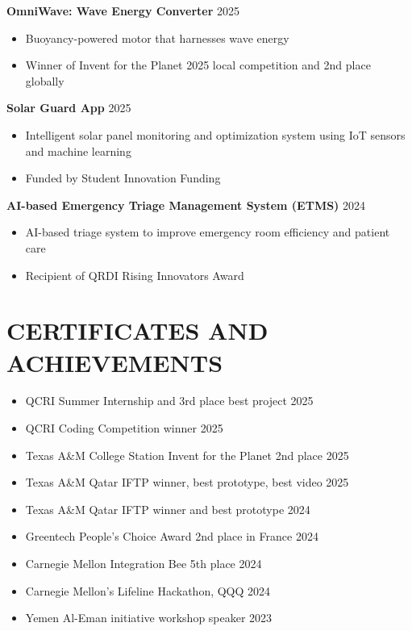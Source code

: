 \documentclass[11pt,a4paper]{article}
\begin{document}
\vspace{4pt}

\textbf{OmniWave: Wave Energy Converter} \hfill 2025
\begin{itemize}[leftmargin=2em, nosep, label={}]
    \item Buoyancy-powered motor that harnesses wave energy
    \item Winner of Invent for the Planet 2025 local competition and 2nd place globally
\end{itemize}

\vspace{4pt}

\textbf{Solar Guard App} \hfill 2025
\begin{itemize}[leftmargin=2em, nosep, label={}]
    \item Intelligent solar panel monitoring and optimization system using IoT sensors and machine learning
    \item Funded by Student Innovation Funding
\end{itemize}

\vspace{4pt}

\textbf{AI-based Emergency Triage Management System (ETMS)} \hfill 2024
\begin{itemize}[leftmargin=2em, nosep, label={}]
    \item AI-based triage system to improve emergency room efficiency and patient care
    \item Recipient of QRDI Rising Innovators Award
\end{itemize}

\section*{CERTIFICATES AND ACHIEVEMENTS}
\begin{itemize}[leftmargin=0em, nosep, label={}]
    \item QCRI Summer Internship and 3rd place best project \hfill 2025
    \item QCRI Coding Competition winner \hfill 2025
    \item Texas A\&M College Station Invent for the Planet 2nd place \hfill 2025
    \item Texas A\&M Qatar IFTP winner, best prototype, best video \hfill 2025
    \item Texas A\&M Qatar IFTP winner and best prototype \hfill 2024
    \item Greentech People's Choice Award 2nd place in France \hfill 2024
    \item Carnegie Mellon Integration Bee 5th place \hfill 2024
    \item Carnegie Mellon's Lifeline Hackathon, QQQ \hfill 2024
    \item Yemen Al-Eman initiative workshop speaker \hfill 2023
\end{itemize}
\end{document}
